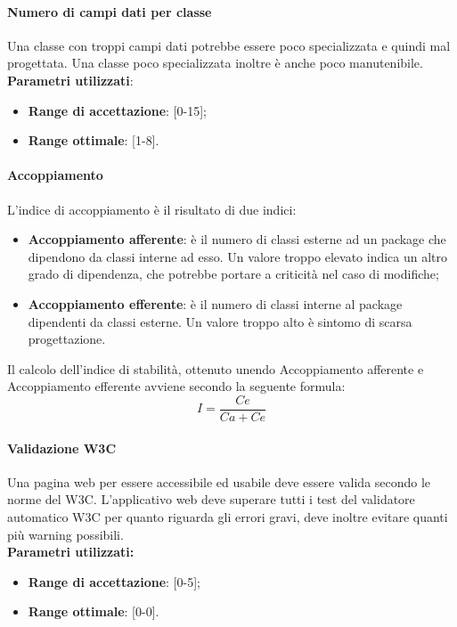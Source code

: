 \documentclass[12pt,a4paper,titlepage]{article}
\begin{document}
			\paragraph{Numero di campi dati per classe}
			Una classe con troppi campi dati potrebbe essere poco specializzata e quindi mal progettata. Una classe poco specializzata inoltre è anche poco manutenibile.\\
			\textbf{Parametri utilizzati}:
			\begin{itemize}
				\item \textbf{Range di accettazione}: [0-15];
				\item \textbf{Range ottimale}: [1-8].
			\end{itemize}
		
			\paragraph{Accoppiamento}
			L'indice di accoppiamento è il risultato di due indici:
			\begin{itemize}
				\item \textbf{Accoppiamento afferente}: è il numero di classi esterne ad un package che dipendono da classi interne ad esso. Un valore troppo elevato indica un altro grado di dipendenza, che potrebbe portare a criticità nel caso di modifiche;
				\item \textbf{Accoppiamento efferente}: è il numero di classi interne al package dipendenti da classi esterne. Un valore troppo alto è sintomo di scarsa progettazione.
			\end{itemize}			
			Il calcolo dell'indice di stabilità, ottenuto unendo Accoppiamento afferente e Accoppiamento efferente avviene secondo la seguente formula:
			\[I=\frac{Ce}{Ca+Ce}\]
			
			\paragraph{Validazione W3C}
			Una pagina web per essere accessibile ed usabile deve essere valida secondo le norme del W3C. L'applicativo web deve superare tutti i test del validatore automatico W3C per quanto riguarda gli errori gravi, deve inoltre evitare quanti più warning possibili.\\
			\textbf{Parametri utilizzati:}
			\begin{itemize}
				\item \textbf{Range di accettazione}: [0-5];
				\item \textbf{Range ottimale}: [0-0].
			\end{itemize}
\end{document}
